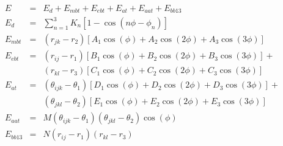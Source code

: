 \documentclass[12pt]{article}
\begin{document}
\begin{eqnarray*}
  E & = & E_d + E_{mbt} + E_{ebt} + E_{at} + E_{aat} + E_{bb13} \\
  E_d & = & \sum_{n=1}^{3} K_n [ 1 - \cos (n \phi - \phi_n) ] \\
  E_{mbt} & = & (r_{jk} - r_2) [ A_1 \cos (\phi) + A_2 \cos (2\phi) + A_3 \cos (3\phi) ] \\
  E_{ebt} & = & (r_{ij} - r_1) [ B_1 \cos (\phi) + B_2 \cos (2\phi) + B_3 \cos (3\phi) ] + \\
  & & (r_{kl} - r_3) [ C_1 \cos (\phi) + C_2 \cos (2\phi) + C_3 \cos (3\phi) ] \\
  E_{at} & = & (\theta_{ijk} - \theta_1) [ D_1 \cos (\phi) + D_2 \cos (2\phi) + D_3 \cos (3\phi) ] + \\
  & & (\theta_{jkl} - \theta_2) [ E_1 \cos (\phi) + E_2 \cos (2\phi) + E_3 \cos (3\phi) ] \\
  E_{aat} & = & M (\theta_{ijk} - \theta_1) (\theta_{jkl} - \theta_2) \cos (\phi) \\
  E_{bb13} & = & N (r_{ij} - r_1) (r_{kl} - r_3)
\end{eqnarray*}
\end{document}
